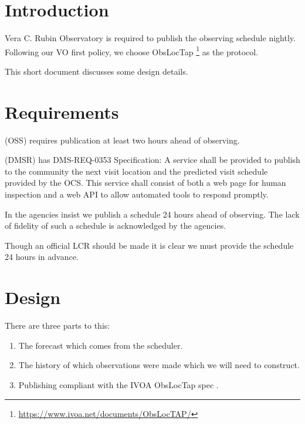 \def\DB{ObsLocTAP database }

\section{Introduction}
Vera C. Rubin Observatory is required to publish the observing schedule nightly. Following our VO first policy, we  choose ObsLocTap \citep{2021ivoa.spec.0724S} \footnote{\url{https://www.ivoa.net/documents/ObsLocTAP/}} as the protocol.

This short document discusses some design details.

\section{Requirements}

 (OSS) requires publication at least two hours ahead of observing.

 (DMSR) has
DMS-REQ-0353
Specification: A service shall be provided to publish to the community the next visit location and the predicted visit schedule provided by the OCS. This service shall consist of both a web page for human inspection and a web API to allow automated tools to respond promptly.


In  the agencies insist we publish a schedule 24 hours ahead of observing.
The lack of fidelity of such a schedule is acknowledged by the agencies.

Though an official LCR should be made it is clear we must provide the schedule 24 hours in advance.


\section{Design}


There are three parts to this:


\begin{enumerate}
\item The forecast  which comes from the scheduler.
\item The history of which observations were made which we will need to construct.
\item Publishing compliant with the IVOA ObsLocTap  spec \citep{2021ivoa.spec.0724S}.
\end{enumerate}

